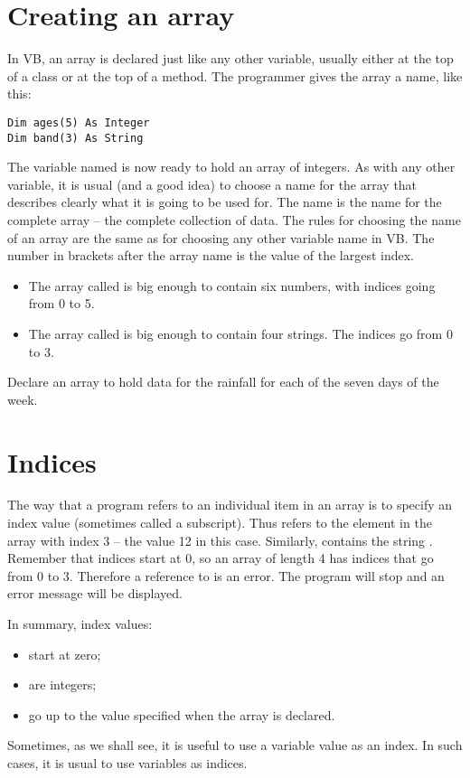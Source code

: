	\section{Creating an array}
		In VB, an array is declared just like any other variable, usually either at the top of a class or at the top of a method. The programmer gives the array a name, like this:
		\begin{lstlisting}
Dim ages(5) As Integer
Dim band(3) As String
		\end{lstlisting}
		The variable named  is now ready to hold an array of integers. As with any other variable, it is usual (and a good idea) to choose a name for the array that describes clearly what it is going to be used for. The name is the name for the complete array – the complete collection of data. The rules for choosing the name of an array are the same as for choosing any other variable name in VB. The number in brackets after the array name is the value of the largest index.
		\begin{itemize}
			\item The array called  is big enough to contain six numbers, with indices going from 0 to 5.
			\item The array called  is big enough to contain four strings. The indices go from 0 to 3.
		\end{itemize}

		\begin{stqb}
			\begin{STQ}
				\item	Declare an array to hold data for the rainfall for each of the seven days of the week.
			\end{STQ}
		\end{stqb}


	\section{Indices}
	The way that a program refers to an individual item in an array is to specify an index value (sometimes called a subscript). Thus  refers to the element in the array with index 3 – the value 12 in this case. Similarly,  contains the string . Remember that indices start at 0, so an array of length 4 has indices that go from 0 to 3. Therefore a reference to  is an error. The program will stop and an error message will be displayed.
		
		In summary, index values:
		\begin{itemize}
      \item start at zero;
      \item are integers;
      \item go up to the value specified when the array is declared.
		\end{itemize}
		Sometimes, as we shall see, it is useful to use a variable value as an index. In such cases, it is usual to use  variables as indices.
		
